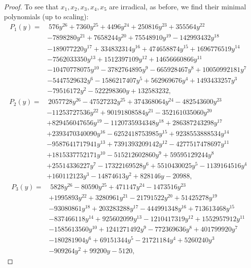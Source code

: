 \documentclass[preprint,12pt,authoryear]{elsarticle}
\begin{document}
\begin{proof}
  To see that $x_1,x_2,x_3,x_4,x_5$ are irradical, as before, we find their minimal 
  polynomials (up to scaling):
  \begin{align*}
    P_1(y)=&~576 y^{26}+7360 y^{25}+4496 y^{24}+250816 y^{23}+355564 y^{22}\\
    &-7898280 y^{21}+7658244 y^{20}+75548910 y^{19}-142993432 y^{18}\\
    &-189077220 y^{17}+334832314 y^{16}+474658874 y^{15}+1696776519 y^{14}\\
    &-7562033350 y^{13}+1512397109 y^{12}+14656660866 y^{11}\\
    &-10470778075 y^{10}-3782764895 y^9-665928467 y^8+10050992181 y^7\\
    &-5447529632 y^6-1586217407 y^5+562969676 y^4+1493433257 y^3\\
    &-79516172 y^2-522298360 y+132583232,
  \end{align*}
  \begin{align*}
    P_2(y)=&~2057728 y^{26}-47527232 y^{25}+374368064 y^{24}-482543600 y^{23}\\
    &-11253727536 y^{22}+90191808584 y^{21}-352161035060 y^{20}\\
    &+829456047656 y^{19}-1120735934348 y^{18}+286387243298 y^{17}\\
    &+2393470340090 y^{16}-6252418753985 y^{15}+9238553888534 y^{14}\\
    &-9587641717941 y^{13}+7391393209142 y^{12}-4277517478697 y^{11}\\
    &+1815337752171 y^{10}-515212602860 y^9+59595129244 y^8\\
    &+25514336227 y^7-17322169528 y^6+5510430025 y^5-1139164516 y^4\\
    &+160112123 y^3-14874613 y^2+828146 y-20988,
  \end{align*}
  \begin{align*}
    P_3(y)=&~5828 y^{26}-80590 y^{25}+471147 y^{24}-1473516 y^{23}\\
    &+1995893 y^{22}+3280961 y^{21}-21791522 y^{20}+51425278 y^{19}\\
    &-93080861 y^{18}+203283288 y^{17}-444991348 y^{16}+713613468 y^{15}\\
    &-837466118 y^{14}+925602099 y^{13}-1210417319 y^{12}+1552957912 y^{11}\\
    &-1585613560 y^{10}+1241271492 y^9-772369636 y^8+401799920 y^7\\
    &-180281904 y^6+69151344 y^5-21721184 y^4+5260240 y^3\\
    &-909264 y^2+99200 y-5120,

\end{align*}
\end{proof}
\end{document}
